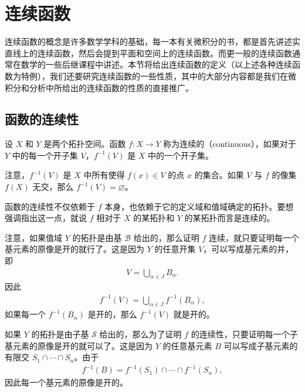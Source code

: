\documentclass[../../main.tex]{subfiles}
\begin{document}
\section{连续函数}\label{section:ch02-连续函数}

连续函数的概念是许多数学学科的基础，每一本有关微积分的书，都是首先讲述实直线上的连续函数，然后会提到平面和空间上的连续函数。而更一般的连续函数通常在数学的一些后继课程中讲述。本节将给出连续函数的定义（以上述各种连续函数为特例），我们还要研究连续函数的一些性质，其中的大部分内容都是我们在微积分和分析中所给出的连续函数的性质的直接推广。

\subsection*{函数的连续性}

\begin{definition}[连续函数]\label{definition:ch02-连续函数}
设 $X$ 和 $Y$ 是两个拓扑空间。函数 $f: X \rightarrow Y$ 称为连续的（continuous），如果对于 $Y$ 中的每一个开子集 $V$，$f^{-1}(V)$ 是 $X$ 中的一个开子集。
\end{definition}

注意，$f^{-1}(V)$ 是 $X$ 中所有使得 $f(x) \in V$ 的点 $x$ 的集合。如果 $V$ 与 $f$ 的像集 $f(X)$ 无交，那么 $f^{-1}(V) = \varnothing$。

函数的连续性不仅依赖于 $f$ 本身，也依赖于它的定义域和值域确定的拓扑。要想强调指出这一点，就说 $f$ 相对于 $X$ 的某拓扑和 $Y$ 的某拓扑而言是连续的。

注意，如果值域 $Y$ 的拓扑是由基 $\mathcal{B}$ 给出的，那么证明 $f$ 连续，就只要证明每一个基元素的原像是开的就行了。这是因为 $Y$ 的任意开集 $V$，可以写成基元素的并，即
\begin{align*}
V = \bigcup_{\alpha \in J} B_{\alpha}.
\end{align*}
因此
\begin{align*}
f^{-1}(V) = \bigcup_{\alpha \in J} f^{-1}(B_{\alpha}),
\end{align*}
如果每一个 $f^{-1}(B_{\alpha})$ 是开的，那么 $f^{-1}(V)$ 就是开的。

如果 $Y$ 的拓扑是由子基 $\mathcal{S}$ 给出的，那么为了证明 $f$ 的连续性，只要证明每一个子基元素的原像是开的就可以了。这是因为 $Y$ 的任意基元素 $B$ 可以写成子基元素的有限交 $S_{1} \cap \cdots \cap S_{n}$。由于
\begin{align*}
f^{-1}(B) = f^{-1}(S_{1}) \cap \cdots \cap f^{-1}(S_{n}),
\end{align*}
因此每一个基元素的原像是开的。
\end{document}
